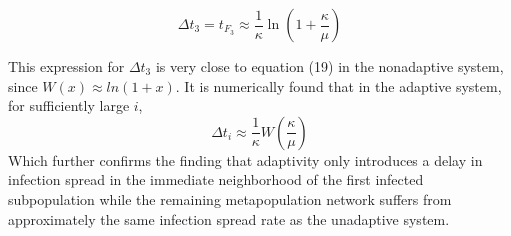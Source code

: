 \documentclass{article}
\begin{document}
\begin{equation}\Delta t_3 = t_{F_3} \approx \frac{1}{\kappa} \ln(1+\frac{ \kappa}{\mu})\end{equation}

This expression for $\Delta t_3$ is very close to equation (19) in the nonadaptive system, since $W(x) \approx ln(1+x)$. It is numerically found that in the adaptive system, for sufficiently large $i$, $$\Delta t_i \approx \frac{1}{\kappa} W(\frac{\kappa}{\mu})$$ 
Which further confirms the finding that adaptivity only introduces a delay in infection spread in the immediate neighborhood of the first infected subpopulation while the remaining metapopulation network suffers from approximately the same infection spread rate as the unadaptive system. 
\end{document}
